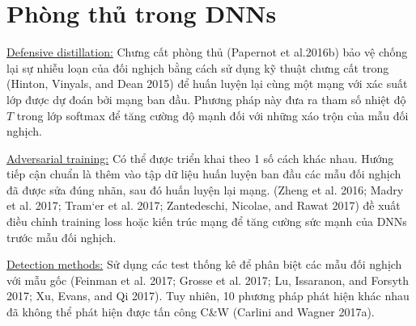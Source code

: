 \section{Phòng thủ trong DNNs}
\underline{Defensive distillation:} Chưng cất phòng thủ (Papernot et al.2016b) bảo vệ 
chống lại sự nhiễu loạn của đối nghịch bằng cách sử dụng kỹ thuật chưng cất trong (Hinton, 
Vinyals, and Dean 2015) để huấn luyện lại cùng một mạng với xác suất lớp được dự đoán bởi 
mạng ban đầu. Phương pháp này đưa ra tham số nhiệt độ $T$ trong lớp softmax để tăng cường 
độ mạnh đối với những xáo trộn của mẫu đối nghịch.

\underline{Adversarial training:} Có thể được triển khai theo 1 số cách khác nhau. 
Hướng tiếp cận chuẩn là thêm vào tập dữ liệu huấn luyện ban đầu các mẫu đối nghịch đã được 
sửa đúng nhãn, sau đó huấn luyện lại mạng. (Zheng et al. 2016; Madry et al. 2017; 
Tram`er et al. 2017; Zantedeschi, Nicolae, and Rawat 2017) đề xuất điều chỉnh training 
loss hoặc kiến trúc mạng để tăng cường sức mạnh của DNNs trước mẫu đối nghịch.

\underline{Detection methods:} Sử dụng các test thống kê để phân biệt các mẫu đối nghịch 
với mẫu gốc (Feinman et al. 2017; Grosse et al. 2017; Lu, Issaranon, and Forsyth 2017; 
Xu, Evans, and Qi 2017). Tuy nhiên, 10 phương pháp phát hiện khác nhau đã không thể phát 
hiện được tấn công C\&W (Carlini and Wagner 2017a).